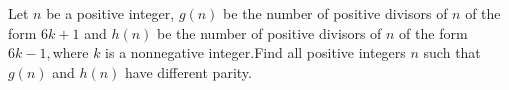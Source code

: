 Let $n$ be a positive integer, $g(n)$ be the number of positive divisors of $n$ of the form $6k+1$ and $h(n)$ be the number of positive divisors of $n$ of the form $6k-1,$where $k$ is a nonnegative integer.Find all positive integers $n$ such that $g(n)$ and $h(n)$ have different parity.
